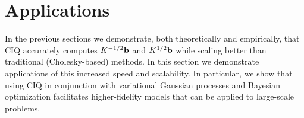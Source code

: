 \section{Applications}

In the previous sections we demonstrate, both theoretically and empirically, that CIQ accurately computes $K^{-1/2} \mathbf{b}$ and $K^{1/2} \mathbf{b}$ while scaling better than traditional (Cholesky-based) methods.
In this section we demonstrate applications of this increased speed and scalability.
In particular, we show that using CIQ in conjunction with variational Gaussian processes and Bayesian optimization facilitates higher-fidelity models that can be applied to large-scale problems.
